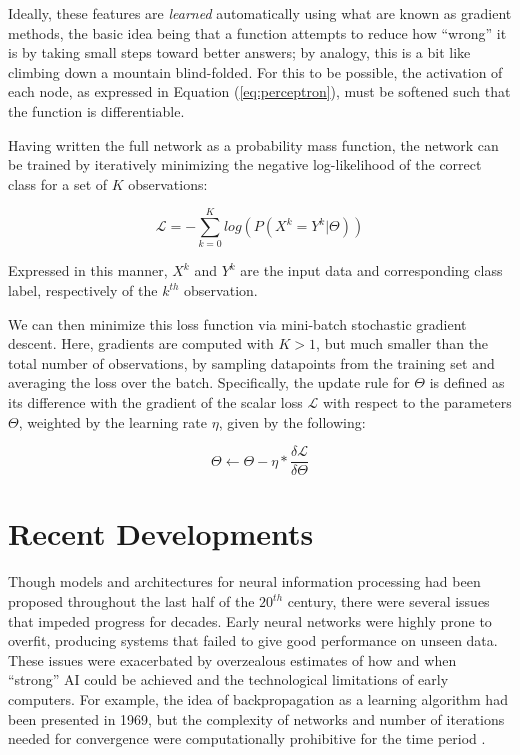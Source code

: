 Ideally, these features are \emph{learned} automatically using what are known as gradient methods, the basic idea being that a function attempts to reduce how ``wrong'' it is by taking small steps toward better answers; by analogy, this is a bit like climbing down a mountain blind-folded.
For this to be possible, the activation of each node, as expressed in Equation (\ref{eq:perceptron}), must be softened such that the function is differentiable.


Having written the full network as a probability mass function, the network can be trained by iteratively minimizing the negative log-likelihood of the correct class for a set of $K$ observations:

\begin{equation}
\label{eq:nll}
\mathcal{L}=-\sum_{k=0}^K log(P(X^k = Y^k \vert \Theta))
\end{equation}

\noindent Expressed in this manner, $X^k$ and $Y^k$ are the input data and corresponding class label, respectively of the $k^{th}$ observation.

We can then minimize this loss function via mini-batch stochastic gradient descent.
Here, gradients are computed with $K>1$, but much smaller than the total number of observations, by sampling datapoints from the training set and averaging the loss over the batch.
Specifically, the update rule for $\Theta$ is defined as its difference with the gradient of the scalar loss $\mathcal{L}$ with respect to the parameters $\Theta$, weighted by the learning rate $\eta$, given by the following:

\begin{equation}
\label{eq:updaterule}
\Theta \leftarrow \Theta - \eta * \frac{ \delta \mathcal{L}}{\delta \Theta}
\end{equation}


\section{Recent Developments}
\label{sec:example}

Though models and architectures for neural information processing had been proposed throughout the last half of the $20^{th}$ century, there were several issues that impeded progress for decades.
Early neural networks were highly prone to overfit, producing systems that failed to give good performance on unseen data.
These issues were exacerbated by overzealous estimates of how and when ``strong'' AI could be achieved and the technological limitations of early computers.
For example, the idea of backpropagation as a learning algorithm had been presented in 1969, but the complexity of networks and number of iterations needed for convergence were computationally prohibitive for the time period \cite{}.

